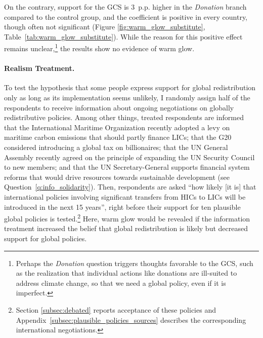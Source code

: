\documentclass[12pt,english]{article}
\begin{document}
\begin{bibunit}
On the contrary, support for the GCS is 3~p.p. higher in the \textit{Donation} branch compared to the control group, and the coefficient is positive in every country, though often not significant (Figure \ref{fig:warm_glow_substitute}, Table~\ref{tab:warm_glow_substitute}). While the reason for this positive effect remains unclear,\footnote{Perhaps the \textit{Donation} question triggers thoughts favorable to the GCS, such as the realization that individual actions like donations are ill-suited to address climate change, so that we need a global policy, even if it is imperfect.} 
the results show no evidence of warm glow.

\paragraph{Realism Treatment.}

To test the hypothesis that some people express support for global redistribution only as long as its implementation seems unlikely, I randomly assign half of the respondents to receive information about ongoing negotiations on globally redistributive policies. Among other things, treated respondents are informed that the International Maritime Organization recently adopted a levy on maritime carbon emissions that should partly finance LICs; that the G20 considered introducing a global tax on billionaires; that the UN General Assembly recently agreed on the principle of expanding the UN Security Council to new members; and that the UN Secretary-General supports financial system reforms that would drive resources towards sustainable development (see Question~\ref{q:info_solidarity}). 
Then, respondents are asked ``how likely [it is] that international policies involving significant transfers from HICs to LICs will be introduced in the next 15 years'', right before their support for ten plausible global policies is tested.\footnote{Section \ref{subsec:debated} reports acceptance of these policies and Appendix~\ref{subsec:plausible_policies_sources} describes the corresponding international negotiations.}  Here, warm glow would be revealed if the information treatment increased the belief that global redistribution is likely but decreased support for global policies. %


\end{bibunit}
\end{document}

